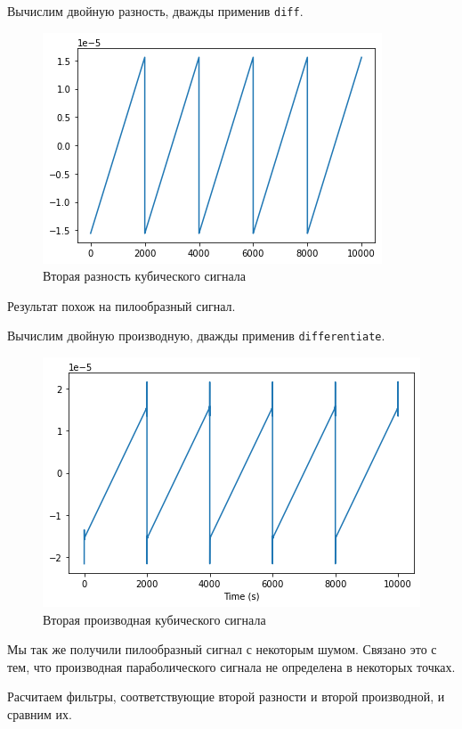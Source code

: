 \documentclass[a4paper, 14pt]{extarticle}
\begin{document}
    Вычислим двойную разность, дважды применив \texttt{diff}.

    \begin{figure}[H]
        \centering
        \includegraphics[width=0.8\linewidth]{cubic_double_diff}
        \caption{Вторая разность кубического сигнала}
        \label{fig:cubic_double_diff}
    \end{figure}

    Результат похож на пилообразный сигнал.

    Вычислим двойную производную, дважды применив \texttt{differentiate}.

    \begin{figure}[H]
        \centering
        \includegraphics[width=0.8\linewidth]{cubic_double_differentiate}
        \caption{Вторая производная кубического сигнала}
        \label{fig:cubic_double_differentiate}
    \end{figure}

    Мы так же получили пилообразный сигнал с некоторым шумом.
    Связано это с тем, что производная параболического сигнала не определена в некоторых точках.

    Расчитаем фильтры, соответствующие второй разности и второй производной, и сравним их.
\end{document}
